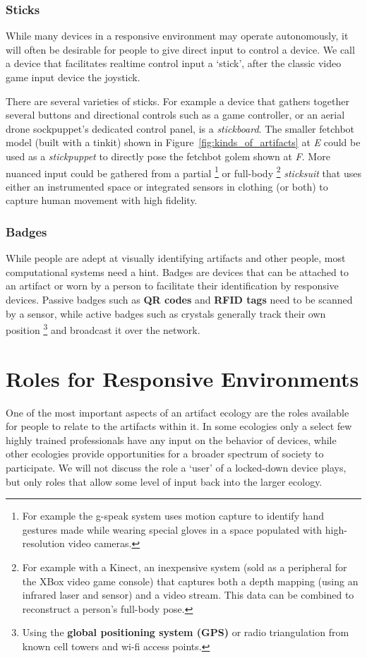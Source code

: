 \subsubsection{Sticks}
While many devices in a responsive environment may operate autonomously, it will often be desirable for people to give direct input to control a device. 
We call a device that facilitates realtime control input a `stick', after the classic video game input device the joystick. 

There are several varieties of sticks. 
For example a device that gathers together several buttons and directional controls such as a game controller, or an aerial drone sockpuppet's dedicated control panel, is a \emph{stickboard}. 
The smaller fetchbot model (built with a tinkit) shown in Figure~\ref{fig:kinds_of_artifacts} at \emph{E} could be used as a \emph{stickpuppet} to directly pose the fetchbot golem shown at \emph{F}. 
More nuanced input could be gathered from a partial%
\footnote{For example the g-speak system \citep{gstalt} uses motion capture to identify hand gestures made while wearing special gloves in a space populated with high-resolution video cameras.}
or full-body%
\footnote{For example with a Kinect, an inexpensive system (sold as a peripheral for the XBox video game console) that captures both a depth mapping (using an infrared laser and sensor) and a video stream. This data can be combined to reconstruct a person's full-body pose.}
\emph{sticksuit} that uses either an instrumented space or integrated sensors in clothing (or both) to capture human movement with high fidelity.

\subsubsection{Badges}
While people are adept at visually identifying artifacts and other people, most computational systems need a hint. Badges are devices that can be attached to an artifact or worn by a person to facilitate their identification by responsive devices. Passive badges such as \textbf{QR codes} and \textbf{RFID tags} need to be scanned by a sensor, while active badges such as crystals generally track their own position%
\footnote{Using the \textbf{global positioning system (GPS)} or radio triangulation from known cell towers and wi-fi access points.}
and broadcast it over the network.


\section{Roles for Responsive Environments}
\label{sec:roles}
%
One of the most important aspects of an artifact ecology are the roles available for people to relate to the artifacts within it. In some ecologies only a select few highly trained professionals have any input on the behavior of devices, while other ecologies provide opportunities for a broader spectrum of society to participate. We will not discuss the role a `user' of a locked-down device plays, but only roles that allow some level of input back into the larger ecology.

